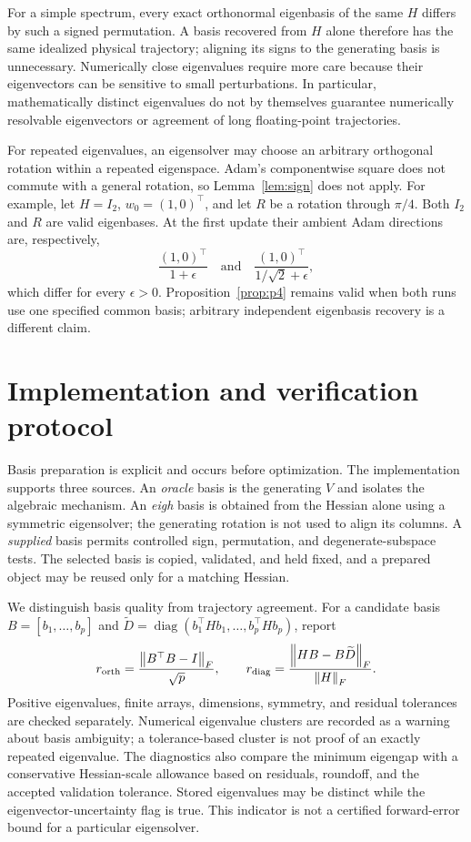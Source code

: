 \documentclass[11pt,a4paper]{article}
\newcommand{\diag}{\operatorname{diag}}
\newcommand{\norm}[1]{\left\lVert#1\right\rVert}
\begin{document}
For a simple spectrum, every exact orthonormal eigenbasis of the same $H$
differs by such a signed permutation. A basis recovered from $H$ alone therefore
has the same idealized physical trajectory; aligning its signs to the generating
basis is unnecessary. Numerically close eigenvalues require more care because
their eigenvectors can be sensitive to small perturbations. In particular,
mathematically distinct eigenvalues do not by themselves guarantee numerically
resolvable eigenvectors or agreement of long floating-point trajectories.

For repeated eigenvalues, an eigensolver may choose an arbitrary orthogonal
rotation within a repeated eigenspace. Adam's componentwise square does not
commute with a general rotation, so Lemma~\ref{lem:sign} does not apply.
For example, let $H=I_2$, $w_0=(1,0)^\top$, and let $R$ be a rotation through
$\pi/4$. Both $I_2$ and $R$ are valid eigenbases. At the first update their
ambient Adam directions are, respectively,
\[
 \frac{(1,0)^\top}{1+\epsilon}
 \quad\text{and}\quad
 \frac{(1,0)^\top}{1/\sqrt2+\epsilon},
\]
which differ for every $\epsilon>0$. Proposition~\ref{prop:p4} remains valid when both runs use one
specified common basis; arbitrary independent eigenbasis recovery is a
different claim.

\section{Implementation and verification protocol}
Basis preparation is explicit and occurs before optimization. The implementation
supports three sources. An \emph{oracle} basis is the generating $V$ and isolates
the algebraic mechanism. An \emph{eigh} basis is obtained from the Hessian alone
using a symmetric eigensolver; the generating rotation is not used to align its
columns. A \emph{supplied} basis permits controlled sign, permutation, and
degenerate-subspace tests. The selected basis is copied, validated, and held
fixed, and a prepared object may be reused only for a matching Hessian.

We distinguish basis quality from trajectory agreement. For a candidate basis
$B=[b_1,\ldots,b_p]$ and
$\widetilde D=\diag(b_1^\top Hb_1,\ldots,b_p^\top Hb_p)$, report
\begin{equation}
 r_{\rm orth}=\frac{\norm{B^\top B-I}_F}{\sqrt p},\qquad
 r_{\rm diag}=\frac{\norm{HB-B\widetilde D}_F}{\norm H_F}.
 \label{eq:residuals}
\end{equation}
Positive eigenvalues, finite arrays, dimensions, symmetry, and residual
tolerances are checked separately. Numerical eigenvalue clusters are recorded
as a warning about basis ambiguity; a tolerance-based cluster is not proof of
an exactly repeated eigenvalue. The diagnostics also compare the minimum
eigengap with a conservative Hessian-scale allowance based on residuals,
roundoff, and the accepted validation tolerance. Stored eigenvalues may be
distinct while the eigenvector-uncertainty flag is true. This indicator is not
a certified forward-error bound for a particular eigensolver.
\end{document}
